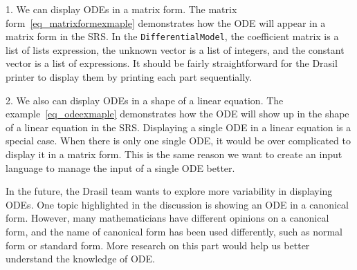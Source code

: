 1. We can display ODEs in a matrix form. The matrix form~\ref{eq_matrixformexmaple} demonstrates how the ODE will appear in a matrix form in the SRS. In the \verb|DifferentialModel|, the coefficient matrix is a list of lists expression, the unknown vector is a list of integers, and the constant vector is a list of expressions. It should be fairly straightforward for the Drasil printer to display them by printing each part sequentially.

2. We also can display ODEs in a shape of a linear equation. The example~\ref{eq_odeexmaple} demonstrates how the ODE will show up in the shape of a linear equation in the SRS. Displaying a single ODE in a linear equation is a special case. When there is only one single ODE, it would be over complicated to display it in a matrix form. This is the same reason we want to create an input language to manage the input of a single ODE better.

In the future, the Drasil team wants to explore more variability in displaying ODEs. One topic highlighted in the discussion is showing an ODE in a canonical form. However, many mathematicians have different opinions on a canonical form, and the name of canonical form has been used differently, such as normal form or standard form. More research on this part would help us better understand the knowledge of ODE.
